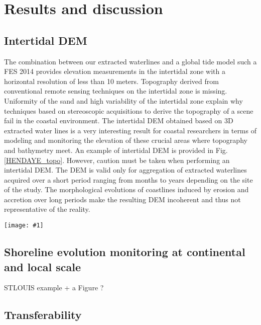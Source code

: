 \documentclass[remotesensing,article,submit,pdftex,moreauthors]{Definitions/mdpi}
\newcommand{\myfigure}[4]{
    \begin{figure*}[h!]
        \centering
        \texttt{[image: \#1]}	 
        \caption{\itshape#2}
        \label{#3}
    \end{figure*} 
}
\begin{document}
\section{Results and discussion}

\subsection{Intertidal DEM}
The combination between our extracted waterlines and a global tide model such a FES 2014 \citep{carrere2016fes} provides elevation measurements in the intertidal zone with a horizontal resolution of less than 10 meters.
Topography derived from conventional remote sensing techniques on the intertidal zone is missing.
Uniformity of the sand and high variability of the intertidal zone explain why techniques based on stereoscopic acquisitions to derive the topography of a scene fail in the coastal environment.
The intertidal DEM obtained based on 3D extracted water lines is a very interesting result for coastal researchers in terms of modeling and monitoring the elevation of these crucial areas where topography and bathymetry meet.
An example of intertidal DEM is provided in Fig.\ref{HENDAYE_topo}.
However, caution must be taken when performing an intertidal DEM.
The DEM is valid only for aggregation of extracted waterlines acquired over a short period ranging from months to years depending on the site of the study.
The morphological evolutions of coastlines induced by erosion and accretion over long periods make the resulting DEM incoherent and thus not representative of the reality.

\myfigure{img/HENDAYE_shoreline_DEM.png}{An example of intertidal DEM on Hendaye beach, SW France. It was obtained from the combination of the extracted instantaneous waterlines and the predicted water levels of each waterline point with FES2014 global tide model of Sentinel-2 acquisition from XX to XX.}{HENDAYE_topo}{1}

\subsection{Shoreline evolution monitoring at continental and local scale}

STLOUIS example + a Figure ?

\subsection{Transferability}
\end{document}
